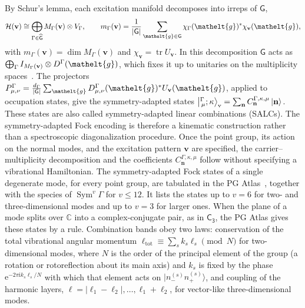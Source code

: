 \documentclass[
  reprint,
  aps,
  prx,
  superscriptaddress,
  amsmath,
  amssymb,
  longbibliography
]{revtex4-2}
\newcommand{\eltfont}[1]{{\let\sigma\eltsigma\mathelt{#1}}}
\newcommand{\grp}[1]{\mathsf{#1}}
\newcommand{\elt}[1]{\eltfont{#1}}
\newcommand{\iunit}{\mathrm{i}}
\newcommand{\expe}{\mathrm{e}}
\newcommand{\trace}{\operatorname{tr}}
\newcommand{\mult}{\kappa}
\newcommand{\cgket}[3]{\bigl\lvert{}^{#1}_{\,#2};#3\bigr\rangle}
\newcommand{\occ}[1]{\lvert #1\rangle}
\newcommand{\gel}{\elt{g}}             %
\DeclareRobustCommand{\pgatlasfont}[1]{{\fontencoding{OT1}\fontfamily{cmss}\fontshape{n}\selectfont#1}}
\newcommand{\PGAtlas}{\pgatlasfont{PG Atlas}}
\begin{document}
By Schur's lemma, each excitation manifold decomposes into irreps of $\grp{G}$,
\begin{equation}
\mathcal H(\mathbf v)\cong\bigoplus_{\Gamma\in\widehat{\grp{G}}}M_\Gamma(\mathbf v)\otimes V_\Gamma,\qquad
m_\Gamma(\mathbf v)=\frac{1}{|\grp{G}|}\sum_{\gel\in\grp{G}}\chi_\Gamma(\gel)^{*}\chi_{\mathbf v}(\gel),
\label{eq:sfe_map}
\end{equation}
with $m_\Gamma(\mathbf v)=\dim M_\Gamma(\mathbf v)$ and $\chi_{\mathbf v}=\trace U_{\mathbf v}$. In this decomposition $\grp{G}$ acts as $\bigoplus_\Gamma I_{M_\Gamma(\mathbf v)}\otimes D^\Gamma(\gel)$, which fixes it up to unitaries on the multiplicity spaces~\cite{BunkerJensen2006}. The projectors $P^\Gamma_{\mu,\nu}=\frac{d_\Gamma}{|\grp{G}|}\sum_{\gel}D^\Gamma_{\mu,\nu}(\gel)^{*}U_{\mathbf v}(\gel)$, applied to occupation states, give the symmetry-adapted states $\cgket{\Gamma}{\mu}{\mult}_{\mathrm v}=\sum_{\mathbf n}C^{\Gamma,\mult,\mu}_{\mathbf n}\ket{\mathbf n}$. These states are also called symmetry-adapted linear combinations (SALCs).
The symmetry-adapted Fock encoding is therefore a kinematic construction rather than a spectroscopic diagonalization procedure. Once the point group, its action on the normal modes, and the excitation pattern \(\mathbf v\) are specified, the carrier--multiplicity decomposition and the coefficients \(C_{\mathbf n}^{\Gamma,\mult,\mu}\) follow without specifying a vibrational Hamiltonian. The symmetry-adapted Fock states of a single degenerate mode, for every point group, are tabulated in the \PGAtlas~\cite{o3harmonics}, together with the species of $\operatorname{Sym}^{v}\Gamma$ for $v\le12$. It lists the states up to $v=6$ for two- and three-dimensional modes and up to $v=3$ for larger ones. When the plane of a mode splits over $\mathbb C$ into a complex-conjugate pair, as in $\grp{C_{3}}$, the \PGAtlas{} gives these states by a rule. Combination bands obey two laws: conservation of the total vibrational angular momentum $\ell_{\mathrm{tot}}\equiv\sum_s k_s\ell_s \pmod N$ for two-dimensional modes, where $N$ is the order of the principal element of the group (a rotation or rotoreflection about its main axis) and $k_s$ is fixed by the phase $\expe^{-2\pi\iunit k_s\ell_s/N}$ with which that element acts on $\occ{n^{(s)}_- n^{(s)}_+}$, and coupling of the harmonic layers, $\ell=|\ell_1-\ell_2|,\ldots,\ell_1+\ell_2$, for vector-like three-dimensional modes.
\end{document}

